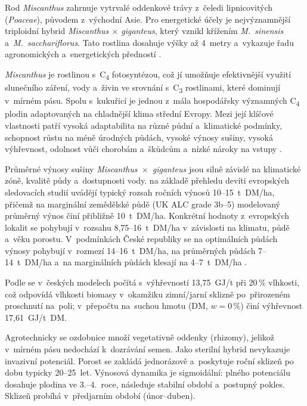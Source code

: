 Rod \textit{Miscanthus} zahrnuje vytrvalé oddenkové trávy z~čeledi lipnicovitých (\textit{Poaceae}), původem z~východní Asie. Pro energetické účely je nejvýznamnější triploidní hybrid \textit{Miscanthus $\times$ giganteus}, který vznikl křížením \textit{M.~sinensis} a~\textit{M.~sacchariflorus}. Tato rostlina dosahuje výšky až 4~metry a~vykazuje řadu agronomických a~energetických předností \citep{Lewandowski2003}.

\textit{Miscanthus} je rostlinou s~C\textsubscript{4} fotosyntézou, což jí umožňuje efektivnější využití slunečního záření, vody a~živin ve srovnání s~C\textsubscript{3} rostlinami, které dominují v~mírném pásu. Spolu s~kukuřicí je jednou z~mála hospodářsky významných C\textsubscript{4} plodin adaptovaných na chladnější klima střední Evropy. Mezi její klíčové vlastnosti patří vysoká adaptabilita na různé půdní a~klimatické podmínky, schopnost růstu na méně úrodných půdách, vysoké výnosy sušiny, vysoká výhřevnost, odolnost vůči chorobám a~škůdcům a~nízké nároky na vstupy \citep{Lewandowski2003}.

Průměrné výnosy sušiny \textit{Miscanthus~$\times$~giganteus} jsou silně 
závislé na klimatické zóně, kvalitě půdy a~dostupnosti vody. 
\citet{mccalmont_2017} na základě přehledu devíti evropských sledovacích 
studií uvádějí typický rozsah ročních výnosů 10--15~t~DM/ha, přičemž 
na marginální zemědělské půdě (UK ALC grade 3b--5) modelovaný průměrný 
výnos činí přibližně 10~t~DM/ha. Konkrétní hodnoty z~evropských lokalit 
se pohybují v~rozsahu 8,75--16~t~DM/ha v~závislosti na klimatu, půdě 
a~věku porostu. V~podmínkách České republiky se na optimálních půdách výnosy pohybují 
v~rozmezí 14--16~t~DM/ha, na průměrných půdách 7--14~t~DM/ha 
a~na marginálních půdách klesají na 4--7~t~DM/ha \citep{VUKOZ2026}. 

Podle \citet{ThetaMetodika2024} se v~českých modelech počítá s~výhřevností
13{,}75~GJ/t při 20\,\% vlhkosti, což odpovídá vlhkosti biomasy
v~okamžiku zimní/jarní sklizně po~přirozeném proschnutí na~poli;
v~přepočtu na~suchou hmotu (DM, $w = 0\,\%$) činí výhřevnost
17{,}61~GJ/t~DM.

Agrotechnicky se ozdobnice množí vegetativně oddenky (rhizomy), jelikož v~mírném pásu nedochází k~dozrávání semen. Jako sterilní hybrid nevykazuje invazivní potenciál. Porost se zakládá jednorázově a~poskytuje roční sklizeň po dobu typicky 20--25~let. Výnosová dynamika je sigmoidální: plného potenciálu dosahuje plodina ve 3.--4.~roce, následuje stabilní období a~postupný pokles. Sklizeň probíhá v~předjarním období (únor--duben).

